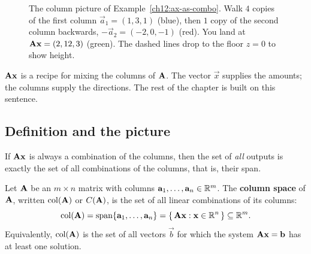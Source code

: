 \begin{figure}[htbp]
\centering
{}
\caption{The column picture of Example~\ref{ch12:ax-as-combo}. Walk $4$ copies
of the first column $\vec{a}_1=(1,3,1)$ (blue), then $1$ copy of the second
column backwards, $-\vec{a}_2=(-2,0,-1)$ (red). You land at
$\mathbf{A}\mathbf{x}=(2,12,3)$ (green). The dashed lines drop to the floor $z=0$ to
show height.}
\label{ch12:fig-ax-combo}
\end{figure}

\begin{focusbox}
$\mathbf{A}\mathbf{x}$ is a recipe for mixing the columns of $\mathbf{A}$. The vector
$\vec{x}$ supplies the amounts; the columns supply the directions. The rest
of the chapter is built on this sentence.
\end{focusbox}

\subsection{Definition and the picture}

If $\mathbf{A}\mathbf{x}$ is always a combination of the columns, then the set of
\emph{all} outputs is exactly the set of all combinations of the columns, that
is, their span.

\begin{definition}\label{ch12:colspace-def}
Let $\mathbf{A}$ be an $m\times n$ matrix with columns
$\mathbf{a}_1,\dots,\mathbf{a}_n \in \mathbb{R}^m$. The \textbf{column space} of $\mathbf{A}$,
written $\operatorname{col}(\mathbf{A})$ or $C(\mathbf{A})$, is the set of all linear combinations
of its columns:
\[
  \operatorname{col}(\mathbf{A}) = \operatorname{span}\{\mathbf{a}_1, \dots, \mathbf{a}_n\}
  = \{\,\mathbf{A}\mathbf{x} : \mathbf{x} \in \mathbb{R}^n\,\} \subseteq \mathbb{R}^m.
\]
Equivalently, $\operatorname{col}(\mathbf{A})$ is the set of all vectors $\vec{b}$ for which the
system $\mathbf{A}\mathbf{x} = \mathbf{b}$ has at least one solution.
\end{definition}

